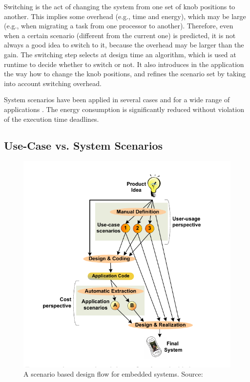 \begin{enumerate}
Switching is the act of changing the system from one set of knob positions to another. This implies some overhead (e.g., time and energy), which may be large (e.g., when migrating a task from one processor to another). 
Therefore, even when a certain scenario (different from the current one) is predicted, it is not always a good idea to switch to it, because the overhead may be larger than the gain. The switching step selects at design time an algorithm, which is used at runtime to decide whether to switch or not. 
It also introduces in the application the way how to change the knob positions, and refines the scenario set by taking into account switching overhead.

\end{enumerate}

System scenarios have been applied in several cases and for a wide range of applications \cite{tcm}.
The energy consumption is significantly reduced without violation of the execution time deadlines.

\subsection{Use-Case vs. System Scenarios}

\begin{figure}[!t]
	\centering
	\includegraphics{Images/versus1.pdf}	
	\caption{A scenario based design flow for embedded systems. Source: \cite{GheoThesis} }
	\label{fig:versus}
\end{figure}

